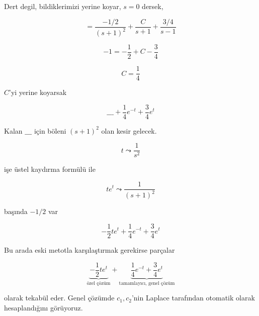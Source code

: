 \documentclass[12pt,fleqn]{article}\usepackage{../../common}
\begin{document}
Dert degil, bildiklerimizi yerine koyar, $s=0$ dersek, 

$$ = \frac{-1/2}{(s+1)^2} + \frac{C}{s+1} + \frac{3/4}{s-1} $$

$$ -1 = -\frac{1}{2} + C - \frac{3}{4}$$

$$ C = \frac{1}{4} $$

$C$'yi yerine koyarsak

$$ \_\_\_ + \frac{1}{4}e^{-t}  + \frac{3}{4}e^t  $$

Kalan $\_\_\_$ için böleni $(s+1)^2$ olan kesir gelecek. 

$$ t \leadsto \frac{1}{s^2} $$

işe üstel kaydırma formülü ile 

$$ te^{t} \leadsto \frac{1}{(s+1)^2} $$

başında $-1/2$ var

$$ -\frac{1}{2}te^t + \frac{1}{4}e^{-t}  + \frac{3}{4}e^t  $$

Bu arada eski metotla karşılaştırmak gerekirse parçalar

$$ 
\underbrace{-\frac{1}{2}te^t}_{\textrm{özel çözüm}} + 
\underbrace{\frac{1}{4}e^{-t}  + \frac{3}{4}e^t}_{\textrm{tamamlayıcı, genel çözüm}}
$$

olarak tekabül eder. Genel çözümde $c_1,c_2$'nin Laplace tarafından
otomatik olarak hesaplandığını görüyoruz. 
\end{document}
